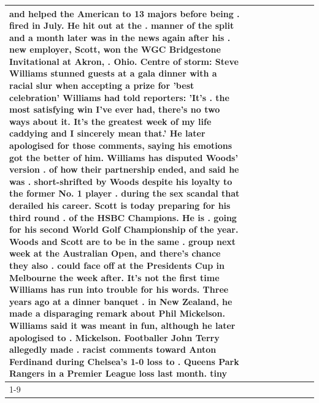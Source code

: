 \begin{table}[H]
\begin{tabular}{lllrlllll}
and helped the American to 13 majors before being . fired in July. He hit out at the . manner of the split and a month later was in the news again after his . new employer, Scott, won the WGC Bridgestone Invitational at Akron, . Ohio. Centre of storm: Steve Williams stunned guests at a gala dinner with a racial slur when accepting a prize for 'best celebration' Williams had told reporters: 'It's . the most satisfying win I've ever had, there's no two ways about it. It's the greatest week of my life caddying and I sincerely mean that.' He later apologised for those comments, saying his emotions got the better of him. Williams has disputed Woods' version . of how their partnership ended, and said he was . short-shrifted by Woods despite his loyalty to the former No. 1 player . during the sex scandal that derailed his career. Scott is today preparing for his third round . of the HSBC Champions. He is . going for his second World Golf Championship of the year. Woods and Scott are to be in the same . group next week at the Australian Open, and there's chance they also . could face off at the Presidents Cup in Melbourne the week after. It's not the first time Williams has run into trouble for his words. Three years ago at a dinner banquet . in New Zealand, he made a disparaging remark about Phil Mickelson. Williams said it was meant in fun, although he later apologised to . Mickelson. Footballer John Terry allegedly made . racist comments toward Anton Ferdinand during Chelsea's 1-0 loss to . Queens Park Rangers in a Premier League loss last month. tiny \\
\cline{1-9}

\end{tabular}
\end{table}
